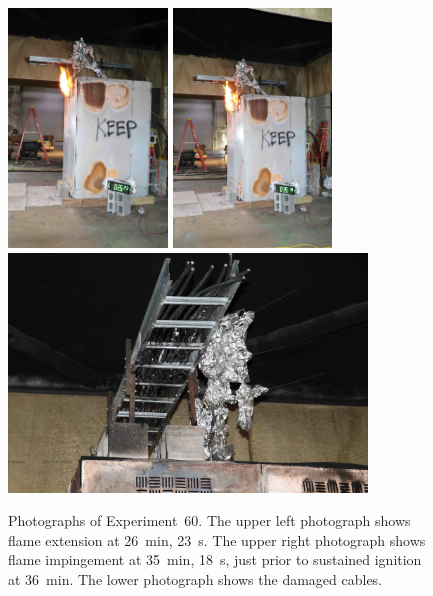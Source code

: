 \begin{figure}[p]
\centering
\includegraphics[height=2.50in,angle=-90]{../FIGURES/Test_60_26_min_23_s} \hspace{0.1in}
\includegraphics[height=2.50in,angle=-90]{../FIGURES/Test_60_35_min_18_s} \\ \vspace{0.1in}
\includegraphics[height=2.50in]{../FIGURES/Test_60_scar}
\caption[Photographs of Experiment~60]{Photographs of Experiment~60. The upper left photograph shows flame extension at 26~min, 23~s. The upper right photograph shows flame impingement at 35~min, 18~s, just prior to sustained ignition at 36~min. The lower photograph shows the damaged cables.}
\label{fig:Test_60_photos}
\end{figure}


